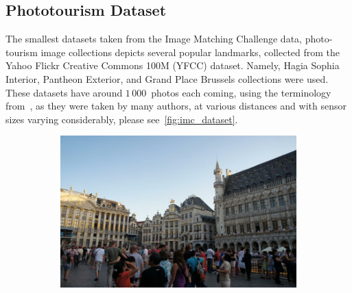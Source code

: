 \subsection{Phototourism Dataset}

The smallest datasets taken from the Image Matching Challenge data, photo-tourism image
collections depicts several popular landmarks, collected from the Yahoo Flickr Creative
Commons 100M (YFCC) dataset. Namely, Hagia Sophia Interior, Pantheon Exterior, and Grand
Place Brussels collections were used. These datasets have around $1\,000$~photos each
coming, using the terminology from~\citet{NRIW},  as they were taken by
many authors, at various distances and with sensor sizes varying considerably, please
see~\cref{fig:imc_dataset}.

\begin{figure}
	\centering
	\begin{subfigure}{.5\textwidth}
		\centering
		\includegraphics[width=.9\textwidth]{../graphics/grand_06498281_8296173847.jpg}
	\end{subfigure}%
	\begin{subfigure}{.5\textwidth}
		\centering

\end{subfigure}
\end{figure}
